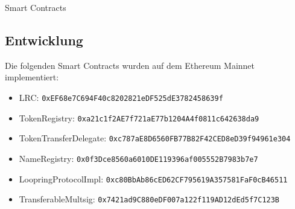 \documentclass[UTF8,nofonts]{article}
\makeatletter
\newenvironment{figurehere}
 {\def\@captype{figure}}
 {}
\makeatother
\begin{document}
\begin{appendices}
\begin{center}
\begin{figurehere}
\caption{Smart Contracts}
\label{fig:smartcontracts}
\end{figurehere}
\end{center}

\subsection{Entwicklung}

Die folgenden Smart Contracts wurden auf dem Ethereum Mainnet implementiert:
\begin{itemize}
\item LRC: \verb|0xEF68e7C694F40c8202821eDF525dE3782458639f|
\item TokenRegistry: \verb|0xa21c1f2AE7f721aE77b1204A4f0811c642638da9|
\item TokenTransferDelegate: \verb|0xc787aE8D6560FB77B82F42CED8eD39f94961e304|
\item NameRegistry: \verb|0x0f3Dce8560a6010DE119396af005552B7983b7e7|
\item LoopringProtocolImpl: \verb|0xc80BbAb86cED62CF795619A357581FaF0cB46511|
\item TransferableMultsig: \verb|0x7421ad9C880eDF007a122f119AD12dEd5f7C123B|
\end{itemize}

\end{appendices}
\end{document}
